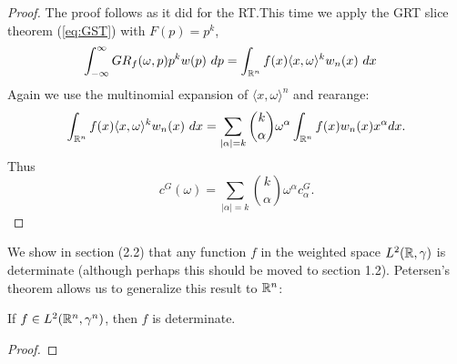 \begin{proof}
  The proof follows as it did for the RT.\@ This time we apply the GRT slice theorem (\ref{eq:GST}) with $F(p) = p^k$, 
  \begin{align*}
    \int_{-\infty}^\infty GR_f(\omega, p) p^k w(p) ~dp
    &= \int_{\mathbb{R}^n} f(x) \langle x, \omega \rangle^k w_n(x) ~dx
  \end{align*}
  Again we use the multinomial expansion of $\langle x, \omega\rangle^n$ and rearange:
  \[
    \int_{\mathbb{R}^n} f(x) \langle x, \omega \rangle^k w_n(x) ~dx
    = \sum_{|\alpha| = k} \binom{k}{\alpha} \omega^\alpha \int_{\mathbb{R}^n} f(x) w_n(x)x^\alpha dx. 
  \]
  Thus
  \[
    c^G(\omega) = \sum_{|\alpha| = k} \binom{k}{\alpha} \omega^\alpha c^G_\alpha.
  \]
\end{proof}

We show in section (2.2) that any function $f$ in the weighted space $L^2(\mathbb{R}, \gamma)$ is determinate (although perhaps this should be moved to section 1.2). Petersen's theorem allows us to generalize this result to $\mathbb{R}^n$:

\begin{corollary}
  If $f \in L^2(\mathbb{R}^n, \gamma^n)$, then $f$ is determinate.
\end{corollary}

\begin{proof}
  \pn
\end{proof}
